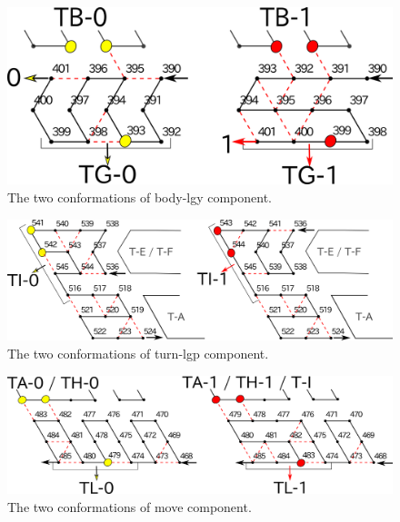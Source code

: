 \documentclass[dvipdfmx,runningheads]{llncs}
\begin{document}
\begin{figure}[h]
\centering
\includegraphics[width=0.5\linewidth]{pic/body-lgy.png}
\caption{The two conformations of body-lgy component.}
\label{fig:body-lgy}
\end{figure}

\begin{figure}[h]
\centering
\includegraphics[width=0.7\linewidth]{pic/turn-lgp.png}
\caption{The two conformations of turn-lgp component.}
\label{fig:turn-lgp}
\end{figure}


\begin{figure}[h]
\centering
\includegraphics[width=0.7\linewidth]{pic/move.png}
\caption{The two conformations of move component.}
\label{fig:move}
\end{figure}
\end{document}
